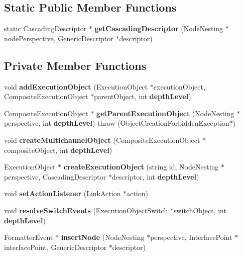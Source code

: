 \subsection*{Static Public Member Functions}
\begin{CompactItemize}
\item 
static CascadingDescriptor $\ast$ \textbf{getCascadingDescriptor} (NodeNesting $\ast$nodePerspective, GenericDescriptor $\ast$descriptor)\label{classbr_1_1pucrio_1_1telemidia_1_1ginga_1_1ncl_1_1emconverter_1_1FormatterConverter_a508bc9da22af793e3d9201dfa99a4f1}

\end{CompactItemize}
\subsection*{Private Member Functions}
\begin{CompactItemize}
\item 
void \textbf{addExecutionObject} (ExecutionObject $\ast$executionObject, CompositeExecutionObject $\ast$parentObject, int {\bf depthLevel})\label{classbr_1_1pucrio_1_1telemidia_1_1ginga_1_1ncl_1_1emconverter_1_1FormatterConverter_cc6dd77e10f65272d45e0f428620839c}

\item 
CompositeExecutionObject $\ast$ \textbf{getParentExecutionObject} (NodeNesting $\ast$perspective, int {\bf depthLevel})  throw (ObjectCreationForbiddenException$\ast$)\label{classbr_1_1pucrio_1_1telemidia_1_1ginga_1_1ncl_1_1emconverter_1_1FormatterConverter_2dd5e7497e0dc915727f1029e8e68a9d}

\item 
void \textbf{createMultichannelObject} (CompositeExecutionObject $\ast$compositeObject, int {\bf depthLevel})\label{classbr_1_1pucrio_1_1telemidia_1_1ginga_1_1ncl_1_1emconverter_1_1FormatterConverter_10994b3a8b7c87abc147236cade79b88}

\item 
ExecutionObject $\ast$ \textbf{createExecutionObject} (string id, NodeNesting $\ast$perspective, CascadingDescriptor $\ast$descriptor, int {\bf depthLevel})\label{classbr_1_1pucrio_1_1telemidia_1_1ginga_1_1ncl_1_1emconverter_1_1FormatterConverter_1f0f41771b8690a91283dfd1bdec1eaf}

\item 
void \textbf{setActionListener} (LinkAction $\ast$action)\label{classbr_1_1pucrio_1_1telemidia_1_1ginga_1_1ncl_1_1emconverter_1_1FormatterConverter_b97d44d6b583b94c53c0e57a726b52ac}

\item 
void \textbf{resolveSwitchEvents} (ExecutionObjectSwitch $\ast$switchObject, int {\bf depthLevel})\label{classbr_1_1pucrio_1_1telemidia_1_1ginga_1_1ncl_1_1emconverter_1_1FormatterConverter_e7d678029aac009baa5287f719f5eb81}

\item 
FormatterEvent $\ast$ \textbf{insertNode} (NodeNesting $\ast$perspective, InterfacePoint $\ast$interfacePoint, GenericDescriptor $\ast$descriptor)\label{classbr_1_1pucrio_1_1telemidia_1_1ginga_1_1ncl_1_1emconverter_1_1FormatterConverter_6b8e874fccaedafa95f5d1e05519f167}

\end{CompactItemize}

